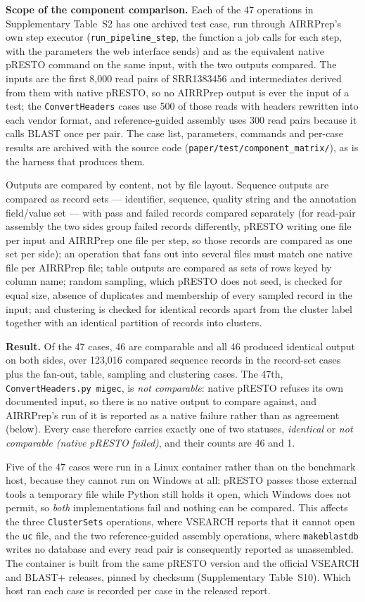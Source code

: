\documentclass[11pt]{article}
\begin{document}
\textbf{Scope of the component comparison.} Each of the 47 operations in
Supplementary Table~S2 has one archived test case, run through AIRRPrep's own
step executor (\texttt{run\_pipeline\_step}, the function a job calls for each
step, with the parameters the web interface sends) and as the equivalent native
pRESTO command on the same input, with the two outputs compared. The inputs are
the first 8,000 read pairs of SRR1383456 and intermediates derived from them
with native pRESTO, so no AIRRPrep output is ever the input of a test; the
\texttt{ConvertHeaders} cases use 500 of those reads with headers rewritten into
each vendor format, and reference-guided assembly uses 300 read pairs because it
calls BLAST once per pair. The case list, parameters, commands and per-case
results are archived with the source code
(\texttt{paper/test/component\_matrix/}), as is the harness that produces them.

Outputs are compared by content, not by file layout. Sequence outputs are
compared as record sets --- identifier, sequence, quality string and the
annotation field/value set --- with pass and failed records compared separately
(for read-pair assembly the two sides group failed records differently, pRESTO
writing one file per input and AIRRPrep one file per step, so those records are
compared as one set per side);
an operation that fans out into several files must match one native file per
AIRRPrep file; table outputs are compared as sets of rows keyed by column name;
random sampling, which pRESTO does not seed, is checked for equal size, absence
of duplicates and membership of every sampled record in the input; and
clustering is checked for identical records apart from the cluster label
together with an identical partition of records into clusters.

\textbf{Result.} Of the 47 cases, 46 are comparable and all 46 produced
identical output on both sides, over 123,016 compared sequence records in the
record-set cases plus the fan-out, table, sampling and clustering cases. The
47th, \texttt{ConvertHeaders.py migec}, is \emph{not comparable}: native pRESTO
refuses its own documented input, so there is no native output to compare
against, and AIRRPrep's run of it is reported as a native failure rather than
as agreement (below). Every case therefore carries exactly one of two
statuses, \emph{identical} or \emph{not comparable (native pRESTO failed)}, and
their counts are 46 and 1.

Five of the 47 cases were run in a Linux container rather than on the benchmark
host, because they cannot run on Windows at all: pRESTO passes those external
tools a temporary file while Python still holds it open, which Windows does not
permit, so \emph{both} implementations fail and nothing can be compared.
This affects the three \texttt{ClusterSets} operations, where VSEARCH reports
that it cannot open the \texttt{uc} file, and the two reference-guided assembly
operations, where \texttt{makeblastdb} writes no database and every read pair is
consequently reported as unassembled. The container is built from the same
pRESTO version and the official VSEARCH and BLAST+ releases, pinned by checksum
(Supplementary Table~S10). Which host ran each case is recorded per case in the
released report.
\end{document}
